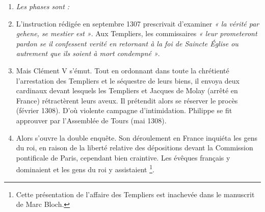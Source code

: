 \documentclass[french,twoside]{book} %
\newlength{\listmod}
\newcommand{\listhead}[1]{\hspace{-1\listmod}\emph{#1}}
\newcommand\chapterclose{} %
\renewcommand\chapterclose{} %
\begin{document}
\begin{enumerate}[itemsep=\baselineskip,]
\item[]\listhead{Les phases sont :}
\item 
{}L’instruction rédigée en septembre 1307 prescrivait d’examiner \emph{« la vérité par gehene, se mestier est »}. Aux Templiers, les commissaires \emph{« leur prometeront pardon se il confessent verité en retornant à la foi de Saincte Église ou autrement que ils soient à mort condempné »}.

\item Mais Clément V s’émut. Tout en ordonnant dans toute la chrétienté l’arrestation des Templiers et le séquestre de leurs biens, il envoya deux cardinaux devant lesquels les Templiers et Jacques de Molay (arrêté en France) rétractèrent leurs aveux. Il prétendit alors se réserver le procès (février 1308). D’où violente campagne d’intimidation. Philippe se fit approuver par l’Assemblée de Tours (mai 1308).\par

\item Alors s’ouvre la double enquête. Son déroulement en France inquiéta les gens du roi, en raison de la liberté relative des dépositions devant la Commission pontificale de Paris, cependant bien craintive. Les évêques français y dominaient et les gens du roi y assistaient \footnote{Cette présentation de l’affaire des Templiers est inachevée dans le manuscrit de Marc Bloch.}.


\end{enumerate}\chapterclose
\end{document}
